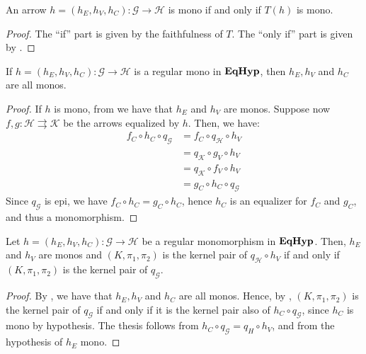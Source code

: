 \begin{corollary}\label{cor:mono1}
	An arrow $h = (h_E, h_V, h_C): \mathcal{G \to H}$ is mono if and only if $T(h)$ is mono.
\end{corollary}

\begin{proof}
	The ``if'' part is given by the faithfulness of $T$.
	The ``only if'' part is given by .
\end{proof}

\begin{corollary}\label{cor:mono2}
	If $h = (h_E, h_V, h_C): \mathcal{G\to H}$ is a regular mono in $\textbf{\textup{EqHyp}}$, then $h_E, h_V$ and $h_C$ are all monos.
\end{corollary}

\begin{proof}
	If $h$ is mono, from  we have that $h_E$ and $h_V$ are monos. Suppose now $f, g: \mathcal{H\rightrightarrows K}$ be the arrows equalized by $h$. Then, we have:
	\begin{align*} f_C \circ h_C \circ q_\mathcal{G} &= f_C\circ q_\mathcal{H} \circ h_V\\&=q_\mathcal{K}\circ g_V \circ h_V\\&=q_\mathcal{K}\circ f_V \circ h_V\\&=g_C \circ h_C \circ q_\mathcal{G} \end{align*}
	Since $q_\mathcal{G}$ is epi, we have $f_C \circ h_C = g_C \circ h_C$, hence $h_C$ is an equalizer for $f_C$ and $g_C$, and thus a monomorphism.
\end{proof}

\begin{proposition}
	Let $h = (h_E, h_V, h_C): \mathcal{G \to H}$ be a regular monomorphism in $\textbf{\textup{EqHyp}}$.
	Then, $h_E$ and $h_V$ are monos and $(K, \pi_1, \pi_2)$ is the kernel pair of $q_\mathcal{H}\circ h_V$ if and only if $(K, \pi_1, \pi_2)$ is the kernel pair of $q_\mathcal{G}$.
\end{proposition}

\begin{proof}
	By , we have that $h_E, h_V$ and $h_C$ are all monos.
	Hence, by , $(K, \pi_1, \pi_2)$ is the kernel pair of $q_\mathcal{G}$ if and only if it is the kernel pair also of $h_C \circ q_\mathcal{G}$, since $h_C$ is mono by hypothesis.
	The thesis follows from $h_C \circ q_\mathcal{G} = q_H \circ h_V$, and from the hypothesis of $h_E$ mono.
\end{proof}


